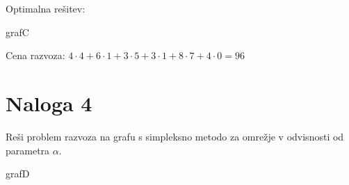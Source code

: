 \documentclass[14pt]{extarticle}
\begin{document}
Optimalna rešitev:

\begin{razvoz}[scale=0.9]{grafC}

\end{razvoz}

Cena razvoza: $4 \cdot 4 + 6 \cdot 1 + 3 \cdot 5 + 3 \cdot 1 + 8 \cdot 7 + 4 \cdot 0 = 96$

\clearpage
\section*{Naloga 4}

Reši problem razvoza na grafu s simpleksno metodo za omrežje
v odvisnosti od parametra $\alpha$.

\begin{razvoz}{grafD}
\end{razvoz}
\end{document}
